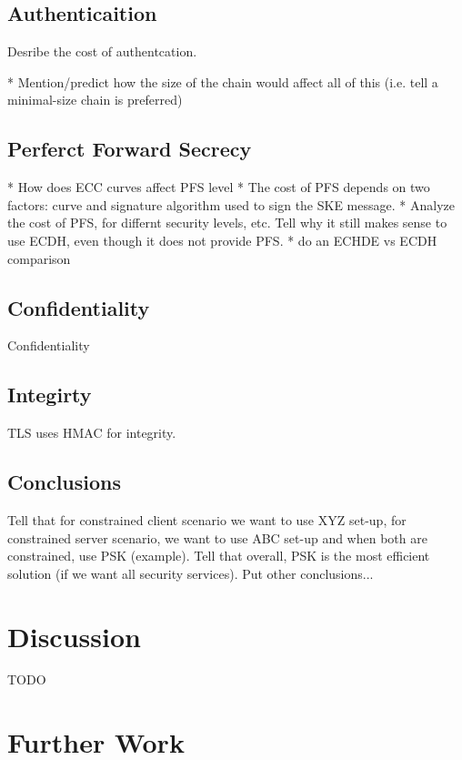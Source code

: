 \documentclass{llncs}
\begin{document}
\subsection{Authenticaition}

Desribe the cost of authentcation.

* Mention/predict how the size of the chain would affect all of this (i.e. tell a minimal-size chain is
preferred)

\subsection{Perferct Forward Secrecy}

* How does ECC curves affect PFS level
* The cost of PFS depends on two factors: curve and signature algorithm used to sign the SKE message.
* Analyze the cost of PFS, for differnt security levels, etc. Tell why it still makes sense to use ECDH, even though
it does not provide PFS.
* do an ECHDE vs ECDH comparison


\subsection{Confidentiality}

Confidentiality

\subsection{Integirty}

TLS uses HMAC for integrity.

\subsection{Conclusions}

Tell that for constrained client scenario we want to use XYZ set-up, for constrained server scenario, we want to use
ABC set-up and when both are constrained, use PSK (example). Tell that overall, PSK is the most efficient solution
(if we want all security services). Put other conclusions...



\section{Discussion}

TODO

\section{Further Work}
\end{document}
